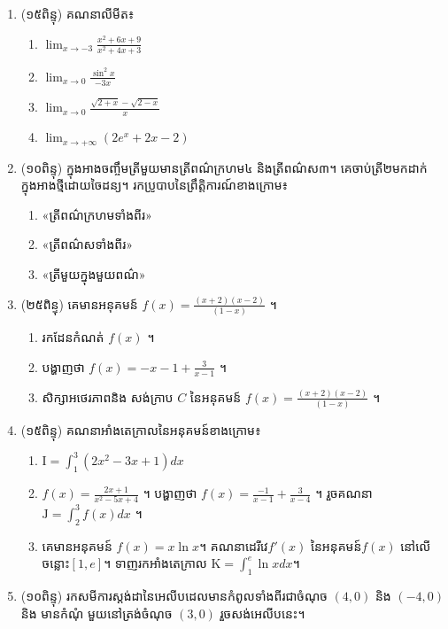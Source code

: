 \documentclass{officialexam}
\begin{document}
\newpage 
\maketitle 
    \begin{enumerate}[I]
\item (១៥ពិន្ទុ) គណនាលីមីត៖

\begin{enumerate}[k,2]
\item  $\lim_{x\to-3}\frac{x^2+6x+9}{x^2+4x+3}$
\item $\lim_{x\to 0}\frac{\sin ^2x}{-3x}$
\item $\lim_{x\to 0}\frac{\sqrt{2+x}-\sqrt{2-x}}{x}$
\item $\lim_{x\to +\infty}\left(2e^x+2x-2\right)$
\end{enumerate}

\item (១០ពិន្ទុ)  ក្នុងអាងចញ្ចឹមត្រីមួយមានត្រីពណ៌ក្រហម៤  និងត្រីពណ៌ស៣។
គេចាប់ត្រី២មកដាក់ក្នុងអាងថ្មីដោយចៃដន្យ។ រកប្រូបាបនៃព្រឹត្តិការណ៍ខាងក្រោម៖
\begin{enumerate}[k]
\item  «ត្រីពណ៌ក្រហមទាំងពីរ»
\item «ត្រីពណ៌សទាំងពីរ»
\item «ត្រីមួយក្នុងមួយពណ៌»
\end{enumerate}
\item (២៥ពិន្ទុ) គេមានអនុគមន៍ $f(x)=\frac{(x+2)(x-2)}{(1-x)}$ ។
\begin{enumerate}[k]
\item រកដែនកំណត់ $f(x)$ ។
\item បង្ហាញថា $f(x)=-x-1+\frac{3}{x-1}$ ។
\item សិក្សាអថេរភាពនិង សង់ក្រាប $C$ នៃអនុគមន៍ $f(x)=\frac{(x+2)(x-2)}{(1-x)}$ ។
\end{enumerate}
\item (១៥ពិន្ទុ) គណនាអាំងតេក្រាលនៃអនុគមន៍ខាងក្រោម៖
			\begin{enumerate}[k]
			\item  $\mathrm{I}=\int_1^3\left(2x^2-3x+1\right)dx$
			\item $f(x)=\frac{2x+1}{x^2-5x+4}$ ។ បង្ហាញថា $f(x)=\frac{-1}{x-1}+\frac{3}{x-4}$ ។ រួចគណនា $\mathrm{J}=\int_2^3f(x)dx$ ។
			\item គេមានអនុគមន៍ $f(x)=x\ln x$។ គណនាដេរីវេ$f'(x)$ នៃអនុគមន៍$f(x)$ នៅលើចន្លោះ$[1,e]$។
			   ទាញរកអាំងតេក្រាល $\mathrm{K}=\int_1^e\ln xdx$។
			\end{enumerate}
\item (១០ពិន្ទុ)  រកសមីការស្តង់ដានៃអេលីបដេលមានកំពូលទាំងពីរជាចំណុច $(4,0)$ និង $(-4,0)$ និង មានកំណុំ  មួយនៅត្រង់ចំណុច $(3,0)$ រួចសង់អេលីបនេះ។
\end{enumerate}
\end{document}
